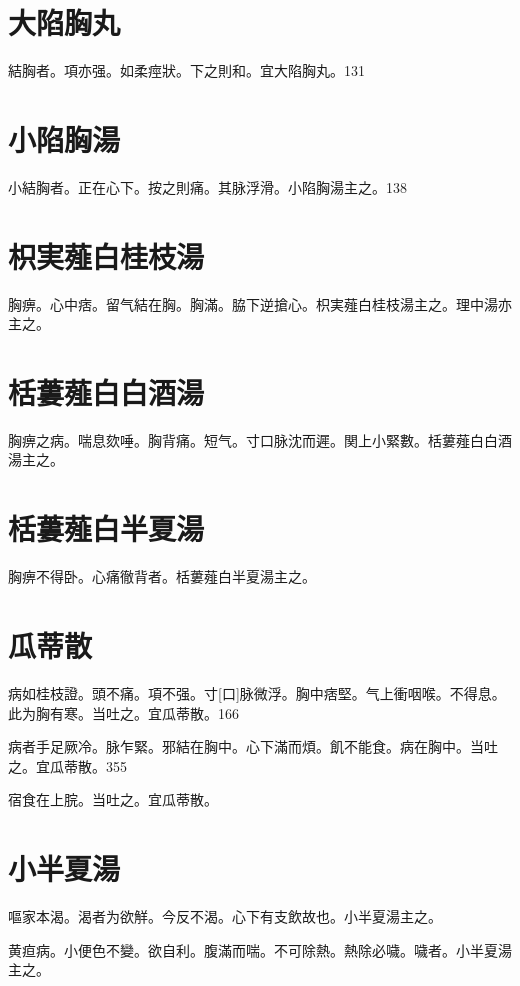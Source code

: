 \documentclass[12pt,oneside,UTF8,b5paper]{ctexbook}她她她她她她她
\begin{document}
\section{大陷胸丸}

結胸者。項亦强。如柔痙狀。下之則和。宜大陷胸丸。131

\section{小陷胸湯}

小結胸者。正在心下。按之則痛。其脉浮滑。小陷胸湯主之。138

\section{枳実薤白桂枝湯}

胸痹。心中痞。留气結在胸。胸滿。脇下逆搶心。枳実薤白桂枝湯主之。理中湯亦主之。

\section{栝蔞薤白白酒湯}

胸痹之病。喘息欬唾。胸背痛。短气。寸口脉沈而遲。関上小緊數。栝蔞薤白白酒湯主之。

\section{栝蔞薤白半夏湯}

胸痹不得卧。心痛徹背者。栝蔞薤白半夏湯主之。

\section{瓜蒂散}

病如桂枝證。頭不痛。項不强。寸[口]脉微浮。胸中痞堅。气上衝咽喉。不得息。此为胸有寒。当吐之。宜瓜蒂散。166

病者手足厥冷。脉乍緊。邪結在胸中。心下滿而煩。飢不能食。病在胸中。当吐之。宜瓜蒂散。355

宿食在上脘。当吐之。宜瓜蒂散。

\section{小半夏湯}

嘔家本渴。渴者为欲觧。今反不渴。心下有支飲故也。小半夏湯主之。

黄疸病。小便色不變。欲自利。腹滿而喘。不可除熱。熱除必噦。噦者。小半夏湯主之。
\end{document}

